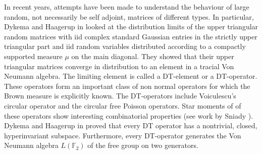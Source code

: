 \documentclass[12pt]{amsart}
\theoremstyle{definition}
\theoremstyle{remark}
\begin{document}
In recent years, attempts have been made to understand the behaviour of large random, not necessarily be self adjoint, matrices of different types. In particular, Dykema and Haagerup in \cite{dykema} looked at the distribution limits of the upper triangular random matrices with iid complex standard Gaussian entries in the strictly upper triangular part and iid random variables distributed according to a compactly supported measure $\mu$ on the main diagonal. They showed that their upper triangular matrices converge in distribution to an element in a tracial Von Neumann algebra. The limiting element is called a DT-element or a DT-operator. These operators form an important class of non normal operators for which the Brown measure is explicitly known.  The DT-operators include Voiculescu's circular operator and the circular free Poisson operators. Star moments of of these operators show interesting combinatorial properties (see work by Sniady \cite{sniady}).  Dykema and Haagerup in \cite{dykemainv} proved that every DT operator has a nontrivial, closed, hyperinvariant subspace. Furthermore, every DT-operator generates the Von Neumann algebra $L(\mathbb{F}_2)$ of the free group on two generators. 









\end{document}
